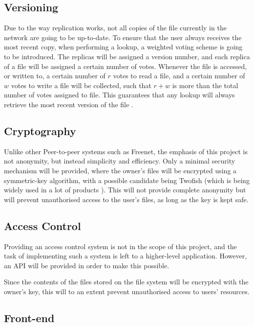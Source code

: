 \documentclass[a4paper, 11pt]{article}
\begin{document}
\subsection{Versioning}
Due to the way replication works, not all copies of the file currently in the network are going to be up-to-date. To ensure that the user always receives the most recent copy, when performing a lookup, a weighted voting scheme is going to be introduced. The replicas will be assigned a version number, and each replica of a file will be assigned a certain number of votes. Whenever the file is accessed, or written to, a certain number of $r$ votes to read a file, and a certain number of $w$ votes to write a file will be collected, such that $r + w$ is more than the total number of votes assigned to file. This guarantees that any lookup will always retrieve the most recent version of the file \cite{versioning}.

\subsection{Cryptography}

Unlike other Peer-to-peer systems such as Freenet, the emphasis of this project is not anonymity, but instead simplicity and efficiency. Only a minimal security mechanism will be provided, where the owner's files will be encrypted using a symmetric-key algorithm, with a possible candidate being Twofish (which is being widely used in a lot of products \cite{twofishprod}).
This will not provide complete anonymity but will prevent unauthorised access to the user's files, as long as the key is kept safe.

\subsection{Access Control}

Providing an access control system is not in the scope of this project, and the task of implementing such a system is left to a higher-level application. However, an API will be provided in order to make this possible. 

Since the contents of the files stored on the file system will be encrypted with the owner's key, this will to an extent prevent unauthorised access to users' resources.

\subsection{Front-end}
\end{document}
